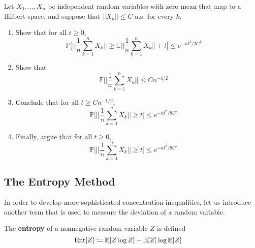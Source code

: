   \begin{exercise}
  Let $X_1, \ldots, X_n$ be independent random variables with zero mean that map to a Hilbert space, and suppose that $||X_k|| \leq C$ a.s. for every $k$. 
  \begin{enumerate}
      \item Show that for all $t \geq 0$, 
      \[\mathbb{P} \bigg[ \bigg| \bigg| \frac{1}{n} \sum_{k=1}^n X_k \bigg| \bigg| \geq \mathbb{E} \bigg| \bigg| \frac{1}{n} \sum_{k=1}^n X_k \bigg| \bigg| + t \bigg] \leq e^{-nt^2 / 2C^2} \]
      
      \item Show that 
      \[\mathbb{E} \bigg| \bigg| \frac{1}{n} \sum_{k=1}^n X_k \bigg| \bigg| \leq C n^{-1/2}\]
      
      \item Conclude that for all $t \geq C n^{-1/2}$, 
      \[\mathbb{P} \bigg[ \bigg| \bigg| \frac{1}{n} \sum_{k=1}^n X_k \bigg| \bigg| \geq t \bigg] \leq e^{-nt^2 / 8C^2}\]
      
      \item Finally, argue that for all $t \geq 0$, 
      \[\mathbb{P} \bigg[ \bigg| \bigg| \frac{1}{n} \sum_{k=1}^n X_k \bigg| \bigg| \geq t \bigg] \leq e^{-nt^2 / 8C^2}\]
  \end{enumerate}
  \end{exercise}

\subsection{The Entropy Method}

  In order to develop more sophisticated concentration inequalities, let us introduce another term that is used to measure the deviation of a random variable. 

  \begin{definition}[Entropy]
  The \textbf{entropy} of a nonnegative random variable $Z$ is defined 
  \[\Ent[Z] \coloneqq \mathbb{E}[Z \log Z] - \mathbb{E}[Z] \log \mathbb{E}[Z]\]
  \end{definition}

